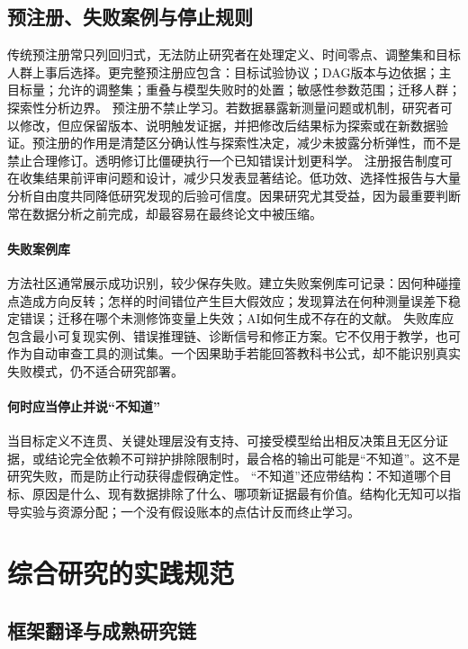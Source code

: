 \subsection{预注册、失败案例与停止规则}

传统预注册常只列回归式，无法防止研究者在处理定义、时间零点、调整集和目标人群上事后选择。更完整预注册应包含：目标试验协议；DAG版本与边依据；主目标量；允许的调整集；重叠与模型失败时的处置；敏感性参数范围；迁移人群；探索性分析边界。
预注册不禁止学习。若数据暴露新测量问题或机制，研究者可以修改，但应保留版本、说明触发证据，并把修改后结果标为探索或在新数据验证。预注册的作用是清楚区分确认性与探索性决定，减少未披露分析弹性，而不是禁止合理修订\parencite{nosek2018,simmons2011}。透明修订比僵硬执行一个已知错误计划更科学。
注册报告制度可在收集结果前评审问题和设计，减少只发表显著结论。低功效、选择性报告与大量分析自由度共同降低研究发现的后验可信度\parencite{ioannidis2005}。因果研究尤其受益，因为最重要判断常在数据分析之前完成，却最容易在最终论文中被压缩。

\paragraph{失败案例库}

方法社区通常展示成功识别，较少保存失败。建立失败案例库可记录：因何种碰撞点造成方向反转；怎样的时间错位产生巨大假效应；发现算法在何种测量误差下稳定错误；迁移在哪个未测修饰变量上失效；AI如何生成不存在的文献。
失败库应包含最小可复现实例、错误推理链、诊断信号和修正方案。它不仅用于教学，也可作为自动审查工具的测试集。一个因果助手若能回答教科书公式，却不能识别真实失败模式，仍不适合研究部署。

\paragraph{何时应当停止并说“不知道”}

当目标定义不连贯、关键处理层没有支持、可接受模型给出相反决策且无区分证据，或结论完全依赖不可辩护排除限制时，最合格的输出可能是“不知道”。这不是研究失败，而是防止行动获得虚假确定性。
“不知道”还应带结构：不知道哪个目标、原因是什么、现有数据排除了什么、哪项新证据最有价值。结构化无知可以指导实验与资源分配；一个没有假设账本的点估计反而终止学习。

\section{综合研究的实践规范}

\subsection{框架翻译与成熟研究链}

